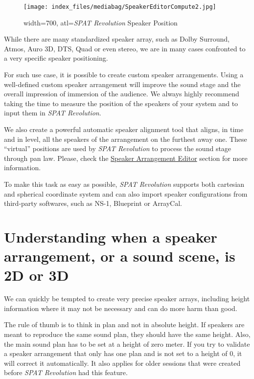 \documentclass[
  letterpaper,
  DIV=11,
  numbers=noendperiod]{scrreport}
\begin{document}
\begin{figure}

{\centering \texttt{[image: index\_files/mediabag/SpeakerEditorCompute2.jpg]}

}

\caption{width=700, atl=\emph{SPAT Revolution} Speaker Position}

\end{figure}

While there are many standardized speaker array, such as Dolby Surround,
Atmos, Auro 3D, DTS, Quad or even stereo, we are in many cases
confronted to a very specific speaker positioning.

For such use case, it is possible to create custom speaker arrangements.
Using a well-defined custom speaker arrangement will improve the sound
stage and the overall impression of immersion of the audience. We always
highly recommend taking the time to measure the position of the speakers
of your system and to input them in \emph{SPAT Revolution}.

We also create a powerful automatic speaker alignment tool that aligns,
in time and in level, all the speakers of the arrangement on the
furthest away one. These ``virtual'' positions are used by \emph{SPAT
Revolution} to process the sound stage through pan law. Please, check
the \href{Spat_Environment_Speaker_Arrangement_Editor.md}{Speaker
Arrangement Editor} section for more information.

To make this task as easy as possible, \emph{SPAT Revolution} supports
both cartesian and spherical coordinate system and can also import
speaker configurations from third-party softwares, such as NS-1,
Blueprint or ArrayCal.

\hypertarget{understanding-when-a-speaker-arrangement-or-a-sound-scene-is-2d-or-3d}{%
\section{Understanding when a speaker arrangement, or a sound scene, is
2D or
3D}\label{understanding-when-a-speaker-arrangement-or-a-sound-scene-is-2d-or-3d}}

We can quickly be tempted to create very precise speaker arrays,
including height information where it may not be necessary and can do
more harm than good.

The rule of thumb is to think in plan and not in absolute height. If
speakers are meant to reproduce the same sound plan, they should have
the same height. Also, the main sound plan has to be set at a height of
zero meter. If you try to validate a speaker arrangement that only has
one plan and is not set to a height of 0, it will correct it
automatically. It also applies for older sessions that were created
before \emph{SPAT Revolution} had this feature.
\end{document}
